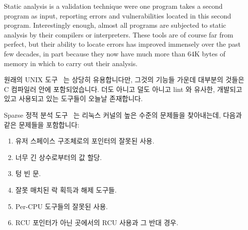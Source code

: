 Static analysis is a validation technique were one program takes a second
program as input, reporting errors and vulnerabilities located in this
second program.
Interestingly enough, almost all programs are subjected to static analysis
by their compilers or interpreters.
These tools are of course far from perfect, but their ability to locate
errors has improved immensely over the past few decades, in part because
they now have much more than 64K bytes of memory in which to carry out their
analysis.
\fi

원래의 UNIX  도구~\cite{StephenJohnson1977lint} 는 상당히
유용합니다만, 그것의 기능들 가운데 대부분의 것들은 C 컴파일러 안에
포함되었습니다.
더도 아니고 덜도 아니고 lint 와 유사한, 개발되고 있고 사용되고 있는 도구들이
오늘날 존재합니다.

Sparse 정적 분석 도구~\cite{JonathanCorbet2004sparse} 는 리눅스 커널의 높은
수준의 문제들을 찾아내는데, 다음과 같은 문제들을 포함합니다:

\begin{enumerate}
\item	유저 스페이스 구조체로의 포인터의 잘못된 사용.
\item	너무 긴 상수로부터의 값 할당.
\item	텅 빈  문.
\item	잘못 매치된 락 획득과 해제 도구들.
\item	Per-CPU 도구들의 잘못된 사용.
\item	RCU 포인터가 아닌 곳에서의 RCU 사용과 그 반대 경우.

\end{enumerate}

